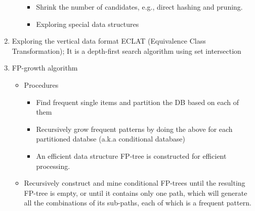 \documentclass[12pt, a4paper]{article}
\begin{document}
\begin{enumerate}
\begin{itemize}
\begin{itemize}
 \item Shrink the number of candidates, e.g., direct hashing and pruning.
 
 \item Exploring special data structures  
  
\end{itemize}
\end{itemize}

\item Exploring the vertical data format ECLAT (Equivalence Class Transformation); It is a depth-first search algorithm using set intersection
 
\item FP-growth algorithm
\begin{itemize}
 \item Procedures 
  \begin{itemize}
   \item Find frequent single items and partition the DB based on each of them
   \item Recursively grow frequent patterns by doing the above for each partitioned databse (a.k.a conditional database)
   \item An efficient data structure FP-tree is constructed for efficient processing.
  \end{itemize}
  
  \item Recursively construct and mine conditional FP-trees until the resulting FP-tree is empty, or until it contains only one path, which will generate all the combinations of its sub-paths, each of which is a frequent pattern.
\end{itemize}

\end{enumerate}
\end{document}
